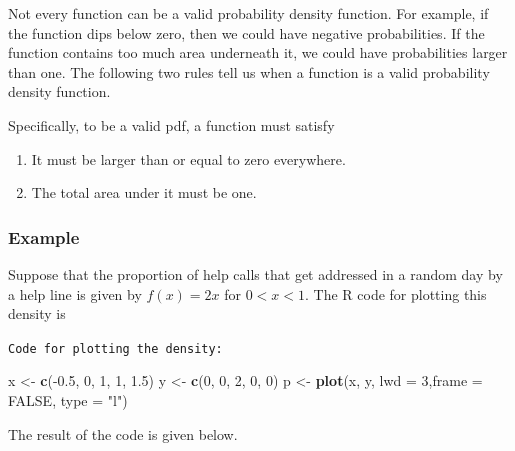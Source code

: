 \documentclass[]{article}
\newenvironment{Shaded}{\begin{snugshade}}{\end{snugshade}}
\newcommand{\KeywordTok}[1]{\textcolor[rgb]{0.13,0.29,0.53}{\textbf{{#1}}}}
\newcommand{\DataTypeTok}[1]{\textcolor[rgb]{0.13,0.29,0.53}{{#1}}}
\newcommand{\DecValTok}[1]{\textcolor[rgb]{0.00,0.00,0.81}{{#1}}}
\newcommand{\FloatTok}[1]{\textcolor[rgb]{0.00,0.00,0.81}{{#1}}}
\newcommand{\StringTok}[1]{\textcolor[rgb]{0.31,0.60,0.02}{{#1}}}
\newcommand{\OtherTok}[1]{\textcolor[rgb]{0.56,0.35,0.01}{{#1}}}
\newcommand{\NormalTok}[1]{{#1}}
\begin{document}
Not every function can be a valid probability density function. For
example, if the function dips below zero, then we could have negative
probabilities. If the function contains too much area underneath it, we
could have probabilities larger than one. The following two rules tell
us when a function is a valid probability density function.

Specifically, to be a valid pdf, a function must satisfy

\begin{enumerate}
\def\labelenumi{\arabic{enumi}.}
\itemsep1pt\parskip0pt
\item
  It must be larger than or equal to zero everywhere.
\item
  The total area under it must be one.
\end{enumerate}

\subsubsection{Example}\label{example-1}

Suppose that the proportion of help calls that get addressed in a random
day by a help line is given by $f(x) = 2 x$ for $0< x < 1$. The R code
for plotting this density is

\vspace{1pc}

\verb;Code for plotting the density:;

\begin{Shaded}
\begin{Highlighting}[]
\NormalTok{x <-}\StringTok{ }\KeywordTok{c}\NormalTok{(-}\FloatTok{0.5}\NormalTok{, }\DecValTok{0}\NormalTok{, }\DecValTok{1}\NormalTok{, }\DecValTok{1}\NormalTok{, }\FloatTok{1.5}\NormalTok{)}
\NormalTok{y <-}\StringTok{ }\KeywordTok{c}\NormalTok{(}\DecValTok{0}\NormalTok{, }\DecValTok{0}\NormalTok{, }\DecValTok{2}\NormalTok{, }\DecValTok{0}\NormalTok{, }\DecValTok{0}\NormalTok{)}
\NormalTok{p <-}\StringTok{ }\KeywordTok{plot}\NormalTok{(x, y, }\DataTypeTok{lwd =} \DecValTok{3}\NormalTok{,}\DataTypeTok{frame =} \OtherTok{FALSE}\NormalTok{, }\DataTypeTok{type =} \StringTok{"l"}\NormalTok{)}
\end{Highlighting}
\end{Shaded}

The result of the code is given below.
\end{document}
